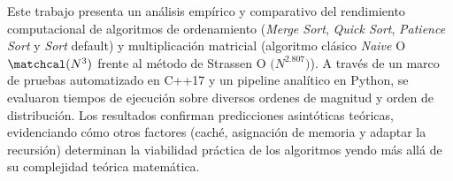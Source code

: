 Este trabajo presenta un análisis empírico y comparativo del rendimiento computacional de algoritmos de ordenamiento (\textit{Merge Sort}, \textit{Quick Sort}, \textit{Patience Sort} y \textit{Sort} default) y multiplicación matricial (algoritmo clásico \textit{Naive} O $\matchcal(N^3)$ frente al método de Strassen O $\mathcal(N^{2.807})$). A través de un marco de pruebas automatizado en C++17 y un pipeline analítico en Python, se evaluaron tiempos de ejecución sobre diversos ordenes de magnitud y orden de distribución. Los resultados confirman predicciones asintóticas teóricas, evidenciando cómo otros factores (caché, asignación de memoria y adaptar la recursión) determinan la viabilidad práctica de los algoritmos yendo más allá de su complejidad teórica matemática.